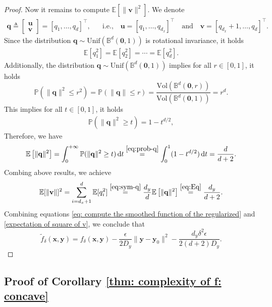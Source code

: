 \documentclass[11pt]{article}
\def\vzero{\mathbf{0}}
\def\vq{\mathbf{q}}
\def\vu{\mathbf{u}}
\def\vv{\mathbf{v}}
\def\vx{\mathbf{x}}
\def\vy{\mathbf{y}}
\begin{document}
\begin{proof}
Now it remains to compute $\mathbb{E}\left[\|\vv\|^2\right]$. 
We denote 
\begin{align*}
\vq\triangleq \begin{bmatrix}
\vu \\ \vv    
\end{bmatrix}
= [q_1, \dots, q_d]^\top, \text{~~~~~i.e.,~~~}
\vu=[q_1, \dots, q_{d_x}]^\top
\text{~~~and~~~}
\vv=[q_{d_x}+1, \dots, q_{d}]^\top.
\end{align*}
Since the distribution $\vq\sim \mathrm{Unif}(\mathbb{B}^d(\vzero,1))$ is rotational invariance, it holds
\begin{align}\label{eq:sym-q}
\mathbb{E}[q_1^2]=\mathbb{E}[q_2^2]=\cdots=\mathbb{E}[q_d^2].
\end{align}
Additionally, the distribution $\vq\sim \mathrm{Unif}(\mathbb{B}^d(\vzero,1))$ implies for all $r\in[0,1]$, it holds
\[
\mathbb{P}(\|\vq\|^2\le r^2)
= \mathbb{P}(\|\vq\|\le r) =
\frac{\mathrm{Vol}(\mathbb{B}^d(\vzero,r))}{\mathrm{Vol}(\mathbb{B}^d(\vzero,1))}
= r^d.
\]
This implies for all $t\in[0,1]$, it holds
\begin{align}\label{eq:prob-q}
\mathbb{P}(\|\vq\|^2\ge t)
= 1- t^{d/2},
\end{align}
Therefore, we have
\begin{align}\label{eq:Eq}
\mathbb{E}\left[\|\vq\|^2\right]
= \int_0^{+\infty} \mathbb{P}(\|\vq\|^2\ge t)\,\mathrm{d}t
\overset{\eqref{eq:prob-q}}= \int_0^1 (1-t^{{d}/{2}})\,\mathrm{d}t
= \frac{d}{d+2}.
\end{align}
Combing above results, we achieve
\begin{align}\label{expectation of square of v}
\mathbb{E}[\|\vv\|]^2
= \sum_{i=d_x+1}^{d}\mathbb{E}[q_i^2]
\overset{\eqref{eq:sym-q}}{=} \frac{d_y}{d} \mathbb{E}\left[\|\vq\|^2\right]
\overset{\eqref{eq:Eq}}{=} \frac{d_y}{d+2}.
\end{align}
Combining equations \eqref{eq: compute the smoothed function of the regularized} and \eqref{expectation of square of v}, we conclude that
\[
\tilde f_\delta(\vx,\vy)
=
f_\delta(\vx,\vy)
-\frac{\epsilon}{2D_y}\|\vy-\vy_0\|^2
-\frac{d_y\delta^2\epsilon}{2(d+2)D_y}.
\]
\end{proof}

\subsection{Proof of Corollary \ref{thm: complexity of f: concave}}
\end{document}
